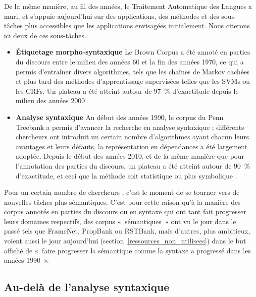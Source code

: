 De la même manière, au fil des années, le Traitement Automatique des Langues a
muri, et s'appuie aujourd'hui sur des applications, des méthodes et des
sous-tâches plus accessibles que les applications envisagées initialement. Nous
citerons ici deux de ces sous-tâches.

\begin{itemize}
    \item \textbf{Étiquetage morpho-syntaxique} Le Brown Corpus a été annoté en
        parties du discours entre le milieu des années 60 et la fin des années
        1970, ce qui a permis d'entraîner divers algorithmes, tels que les
        chaînes de Markov cachées et plus tard des méthodes d'apprentissage
        supervisées telles que les SVMs ou les CRFs. Un plateau a été atteint
        autour de 97~\% d'exactitude depuis le milieu des années 2000
        \citep{manning2011part}.
    \item \textbf{Analyse syntaxique} Au début des années 1990, le corpus du
        Penn Treebank \citep{marcus1993building} a permis d'avancer la
        recherche en analyse syntaxique ; différents chercheurs ont introduit
        un certain nombre d'algorithmes ayant chacun leurs avantages et leurs
        défauts, la représentation en dépendances a été largement adoptée.
        Depuis le début des années 2010, et de la même manière que pour
        l'annotation des parties du discours, un plateau a été atteint autour
        de 90~\% d'exactitude, et ceci que la méthode soit statistique ou plus
        symbolique \citep{clergerie2014improving}.
\end{itemize}

Pour un certain nombre de chercheurs
\citep{bos2012annotating,banarescu2013abstract}, c'est le moment de se tourner
vers de nouvelles tâches plus sémantiques. C'est pour cette raison qu'à la
manière des corpus annotés en parties du discours ou en syntaxe qui ont tant
fait progresser leurs domaines respectifs, des corpus «~sémantiques~» ont vu le
jour dans le passé tels que FrameNet, PropBank ou RSTBank, mais d'autres, plus
ambitieux, voient aussi le jour aujourd'hui
\citep{bos2012annotating,banarescu2013abstract}
(section~\ref{ressources_non_utilisees}) dans le but affiché de «~faire
progresser la sémantique comme la syntaxe a progressé dans les années 1990~».

\subsection{Au-delà de l'analyse syntaxique}
\label{au_dela}

